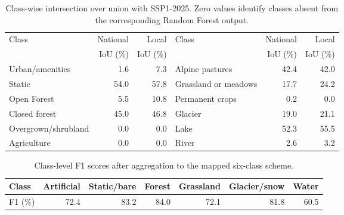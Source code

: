 \begin{table}[!htbp]
  \centering
  \caption{Cross-model agreement with SSP1-2025 on 33,905 paired Bregaglia
  cells. These are consistency measures, not validation accuracies.}
  \label{tab:ssp1-agreement-summary}
  \small
  \setlength{\tabcolsep}{4pt}
\end{table}

\begin{table}[!htbp]
  \centering
  \caption{Class-wise intersection over union with SSP1-2025. Zero values
  identify classes absent from the corresponding Random Forest output.}
  \label{tab:ssp1-class-iou}
  \small
  \begin{tabular}{lrr@{\qquad}lrr}
    \toprule
    Class & National & Local & Class & National & Local \\
          & IoU (\%) & IoU (\%) & & IoU (\%) & IoU (\%) \\
    \midrule
    Urban/amenities      & 1.6  & 7.3  & Alpine pastures      & 42.4 & 42.0 \\
    Static               & 54.0 & 57.8 & Grassland or meadows & 17.7 & 24.2 \\
    Open Forest          & 5.5  & 10.8 & Permanent crops      & 0.2  & 0.0 \\
    Closed forest        & 45.0 & 46.8 & Glacier              & 19.0 & 21.1 \\
    Overgrown/shrubland  & 0.0  & 0.0  & Lake                 & 52.3 & 55.5 \\
    Agriculture          & 0.0  & 0.0  & River                & 2.6  & 3.2 \\
    \bottomrule
  \end{tabular}
\end{table}

\begin{table}[!htbp]
  \centering
  \caption{Class-level F1 scores after aggregation to the mapped six-class
  scheme.}
  \label{tab:rf-class-performance}
  \small
  \begin{tabular}{lrrrrrr}
    \toprule
    Class & Artificial & Static/bare & Forest & Grassland & Glacier/snow & Water \\
    \midrule
    F1 (\%) & 72.4 & 83.2 & 84.0 & 72.1 & 81.8 & 60.5 \\
    \bottomrule
  \end{tabular}
\end{table}

